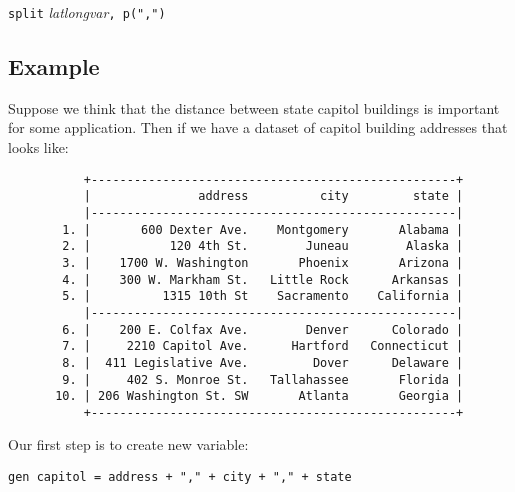 \documentclass[11pt]{article}
\begin{document}
\begin{center}
\verb|split| \textit{latlongvar}\verb|, p(",")|
\end{center}

\subsection{Example}
Suppose we think that the distance between state capitol buildings is important for some application. Then if we have a dataset of capitol building addresses that looks like:



\begin{figure}[ht]
\begin{center}
\begin{verbatim}
     +---------------------------------------------------+
     |               address          city         state |
     |---------------------------------------------------|
  1. |       600 Dexter Ave.    Montgomery       Alabama |
  2. |           120 4th St.        Juneau        Alaska |
  3. |    1700 W. Washington       Phoenix       Arizona |
  4. |    300 W. Markham St.   Little Rock      Arkansas |
  5. |          1315 10th St    Sacramento    California |
     |---------------------------------------------------|
  6. |    200 E. Colfax Ave.        Denver      Colorado |
  7. |     2210 Capitol Ave.      Hartford   Connecticut |
  8. |  411 Legislative Ave.         Dover      Delaware |
  9. |     402 S. Monroe St.   Tallahassee       Florida |
 10. | 206 Washington St. SW       Atlanta       Georgia |
     +---------------------------------------------------+

\end{verbatim}
\end{center}
\end{figure}

Our first step is to create new variable:
\begin{center}
\verb|gen capitol = address + "," + city + "," + state|
\end{center}
\end{document}
